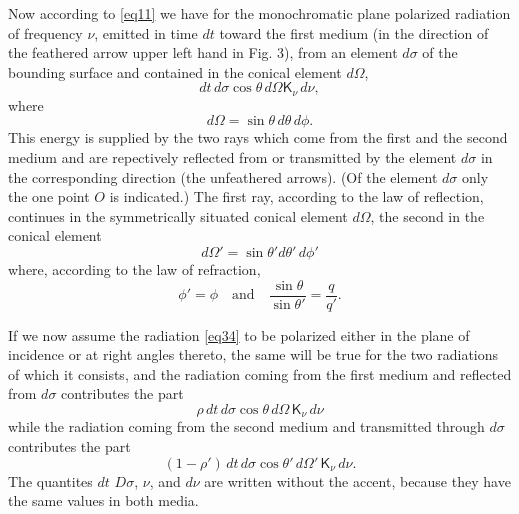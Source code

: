 \documentclass[12pt,oneside]{book}
\begin{document}
Now according to \eqref{eq11} we have for the monochromatic plane polarized radiation of frequency $\nu$, emitted in time $dt$ toward the first medium (in the direction of the feathered arrow upper left hand in Fig. 3), from an element $d\sigma$ of the bounding surface and contained in the conical element $d\Omega$, 
\begin{equation}
    dt\, d\sigma\cos\theta\, d\Omega\mathsf{K}_\nu\, d\nu,
    \label{eq34}
\end{equation}
where
\begin{equation}
    d\Omega=\sin\theta\, d\theta\, d\phi.
    \label{eq35}
\end{equation}
This energy is supplied by the two rays which come from the first and the second medium and are repectively reflected from or transmitted by the element $d\sigma$ in the corresponding direction (the unfeathered arrows). (Of the element $d\sigma$ only the one point $O$ is indicated.) The first ray, according to the law of reflection, continues in the symmetrically situated conical element $d\Omega$, the second in the conical element 
\begin{equation}
    d\Omega'=\sin\theta' d\theta'\, d\phi' 
    \label{eq36}
\end{equation}
where, according to the law of refraction, 
\begin{equation}
    \phi'=\phi \quad \text{and}\quad \frac{\sin\theta}{\sin\theta'}=\frac{q}{q'}.
    \label{eq37}
\end{equation} \par 

If we now assume the radiation \eqref{eq34} to be polarized either in the plane of incidence or at right angles thereto, the same will be true for the two radiations of which it consists, and the radiation coming from the first medium and reflected from $d\sigma$ contributes the part 
\begin{equation}
    \rho\, dt\, d\sigma \cos\theta\, d\Omega\, \mathsf{K}_\nu\, d\nu 
    \label{eq38}
\end{equation}
while the radiation coming from the second medium and transmitted through $d\sigma$ contributes the part 
\begin{equation}
    (1-\rho')\, dt\, d\sigma \cos\theta'\, d\Omega'\, \mathsf{K}_\nu\, d\nu.
    \label{eq39}
\end{equation}
The quantites $dt$ $D\sigma$, $\nu$, and $d\nu$ are written without the accent, because they have the same values in both media. \par 
\end{document}
